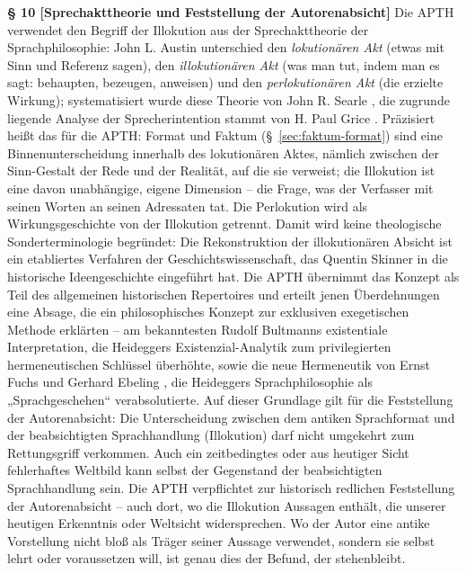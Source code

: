 \documentclass[11pt,a4paper]{article}
\makeatletter
\newcommand{\apth}{{\apthfont APTH}\hspace{0.15em}\xspace}
\newcommand{\apthsec}[3]{%
  \phantomsection%
  \def\@currentlabel{#1}%
  \label{sec:#3}%
  \textbf{§ #1 [#2]}%
}
\makeatother
\begin{document}
\apthsec{10}{Sprechakttheorie und Feststellung der Autorenabsicht}{sprechakttheorie} Die \apth verwendet den Begriff der Illokution aus der Sprechakttheorie der Sprachphilosophie: John L. Austin \citeyearpar{austin1962} unterschied den \textit{lokutionären Akt} (etwas mit Sinn und Referenz sagen), den \textit{illokutionären Akt} (was man tut, indem man es sagt: behaupten, bezeugen, anweisen) und den \textit{perlokutionären Akt} (die erzielte Wirkung); systematisiert wurde diese Theorie von John R. Searle \citeyearpar{searle1969}, die zugrunde liegende Analyse der Sprecherintention stammt von H. Paul Grice \citeyearpar{grice1957}. Präzisiert heißt das für die \apth: Format und Faktum (§~\ref{sec:faktum-format}) sind eine Binnenunterscheidung innerhalb des lokutionären Aktes, nämlich zwischen der Sinn-Gestalt der Rede und der Realität, auf die sie verweist; die Illokution ist eine davon unabhängige, eigene Dimension – die Frage, was der Verfasser mit seinen Worten an seinen Adressaten tat. Die Perlokution wird als Wirkungsgeschichte von der Illokution getrennt. Damit wird keine theologische Sonderterminologie begründet: Die Rekonstruktion der illokutionären Absicht ist ein etabliertes Verfahren der Geschichtswissenschaft, das Quentin Skinner \citeyearpar{skinner1969} in die historische Ideengeschichte eingeführt hat. Die \apth übernimmt das Konzept als Teil des allgemeinen historischen Repertoires und erteilt jenen Überdehnungen eine Absage, die ein philosophisches Konzept zur exklusiven exegetischen Methode erklärten – am bekanntesten Rudolf Bultmanns \citeyearpar{bultmann1941} existentiale Interpretation, die Heideggers Existenzial-Analytik zum privilegierten hermeneutischen Schlüssel überhöhte, sowie die neue Hermeneutik von Ernst Fuchs \citeyearpar{fuchs1959} und Gerhard Ebeling \citeyearpar{ebeling1967}, die Heideggers Sprachphilosophie als „Sprachgeschehen“ verabsolutierte. Auf dieser Grundlage gilt für die Feststellung der Autorenabsicht: Die Unterscheidung zwischen dem antiken Sprachformat und der beabsichtigten Sprachhandlung (Illokution) darf nicht umgekehrt zum Rettungsgriff verkommen. Auch ein zeitbedingtes oder aus heutiger Sicht fehlerhaftes Weltbild kann selbst der Gegenstand der beabsichtigten Sprachhandlung sein. Die \apth verpflichtet zur historisch redlichen Feststellung der Autorenabsicht – auch dort, wo die Illokution Aussagen enthält, die unserer heutigen Erkenntnis oder Weltsicht widersprechen. Wo der Autor eine antike Vorstellung nicht bloß als Träger seiner Aussage verwendet, sondern sie selbst lehrt oder voraussetzen will, ist genau dies der Befund, der stehenbleibt.
\end{document}
